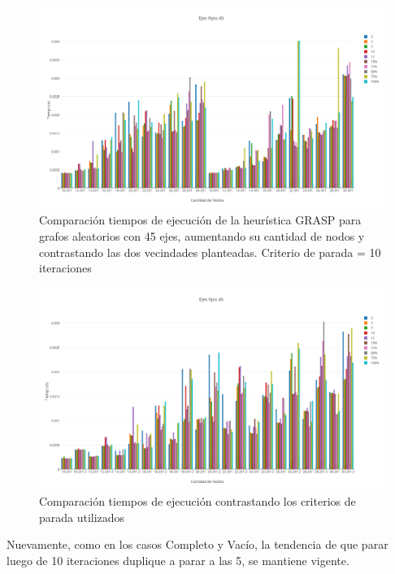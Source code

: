   \begin{figure}[h!]
   \begin{center}
 	\includegraphics[scale=0.35]{imagenes/grasp/45ejes-10repes.png}
 	\caption{Comparaci\'on tiempos de ejecuci\'on de la heur\'istica GRASP para grafos aleatorios con 45 ejes, aumentando su cantidad de nodos y contrastando las dos vecindades planteadas. Criterio de parada = 10 iteraciones}
   \end{center}
 \end{figure}

  \begin{figure}[h!]
   \begin{center}
 	\includegraphics[scale=0.35]{imagenes/grasp/45ejes-5vs10.png}
 	\caption{Comparaci\'on tiempos de ejecuci\'on contrastando los criterios de parada utilizados}
   \end{center}
 \end{figure}
\newpage
Nuevamente, como en los casos Completo y Vac\'io, la tendencia de que parar luego de 10 iteraciones duplique a parar a las 5, se mantiene vigente.



